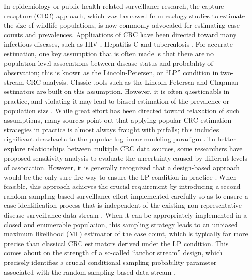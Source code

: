 \documentclass[useAMS,usenatbib,referee]{biom}
\begin{document}
In epidemiology or public health-related surveillance research, the capture-recapture (CRC) approach, which was borrowed from ecology studies to estimate the size of wildlife populations, is now commonly advocated for estimating case counts and prevalences. Applications of CRC have been directed toward many infectious diseases, such as HIV \citep{Poorolajal2017}, Hepatitis C \citep{Wu2005} and tuberculosis \citep{Dunbar2011,Carvalho2020,PerezDuque2020}. For accurate estimation, one key assumption that is often made is that there are no population-level associations between disease status and probability of observation; this is known as the Lincoln-Petersen, or “LP” condition in two-stream CRC analysis. Classic tools such as the Lincoln-Petersen \citep{Lincoln1930,Petersen1986} and Chapman estimators \citep{Chapman1951} are built on this assumption. However, it is often questionable in practice, and violating it may lead to biased estimation of the prevalence or population size \citep{Brenner1995}. While great effort has been directed toward relaxation of such assumptions, many sources \citep{Agresti1994,Hook1995,Cormack1999} point out that applying popular CRC estimation strategies in practice is almost always fraught with pitfalls; this includes significant drawbacks to the popular log-linear modeling paradigm \citep{Fienberg1972,Baillargeon2007,Jones2014,Zhang2023b}. To better explore relationships between multiple CRC data sources, some researchers \citep{Chatterjee2016,Zhang2020,Zhang2023} have proposed sensitivity analysis to evaluate the uncertainty caused by different levels of association. However, it is generally recognized that a design-based approach would be the only sure-fire way to ensure the LP condition in practice \citep{Seber1982,Chao2008,Lyles2022a, Lyles2022b}. When feasible, this approach achieves the crucial requirement by introducing a second random sampling-based surveillance effort implemented carefully so as to ensure a case identification process that is independent of the existing non-representative disease surveillance data stream \citep{Lyles2022a}. When it can be appropriately implemented in a closed and enumerable population, this sampling strategy leads to an unbiased maximum likelihood (ML) estimator of the case count, which is typically far more precise than classical CRC estimators derived under the LP condition. This comes about on the strength of a so-called “anchor stream” design, which precisely identifies a crucial conditional sampling probability parameter associated with the random sampling-based data stream \citep{Lyles2022a,Lyles2022b}.
\end{document}
